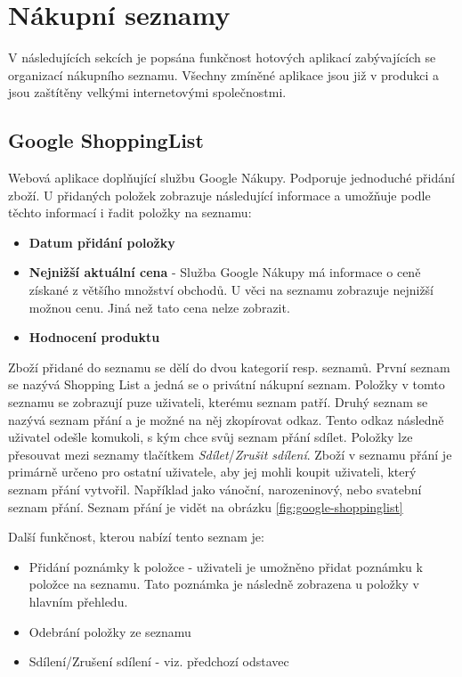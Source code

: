 \section{Nákupní seznamy}
V následujících sekcích je popsána funkčnost hotových aplikací zabývajících se organizací nákupního seznamu. Všechny zmíněné aplikace jsou již v produkci a jsou zaštítěny velkými internetovými společnostmi.

\subsection{Google ShoppingList}
Webová aplikace doplňující službu Google Nákupy. Podporuje jednoduché přidání zboží. U přidaných položek zobrazuje následující informace a umožňuje podle těchto informací i řadit položky na seznamu:
\begin{itemize}
\item \textbf{Datum přidání položky}
\item \textbf{Nejnižší aktuální cena} - Služba Google Nákupy má informace o ceně získané z většího množství obchodů. U věci na seznamu zobrazuje nejnižší možnou cenu. Jiná než tato cena nelze zobrazit.
\item \textbf{Hodnocení produktu}
\end{itemize}
Zboží přidané do seznamu se dělí do dvou kategorií resp. seznamů. První seznam se nazývá Shopping List a jedná se o privátní nákupní seznam. Položky v tomto seznamu se zobrazují puze uživateli, kterému seznam patří. Druhý seznam se nazývá seznam přání a je možné na něj zkopírovat odkaz. Tento odkaz následně uživatel odešle komukoli, s kým chce svůj seznam přání sdílet. Položky lze přesouvat mezi seznamy tlačítkem \emph{Sdílet}/\emph{Zrušit sdílení}.
Zboží v seznamu přání je primárně určeno pro ostatní uživatele, aby jej mohli koupit uživateli, který seznam přání vytvořil. Například jako vánoční, narozeninový, nebo svatební seznam přání. Seznam přání je vidět na obrázku \ref{fig:google-shoppinglist}

Další funkčnost, kterou nabízí tento seznam je:
\begin{itemize}
\item Přidání poznámky k položce - uživateli je umožněno přidat poznámku k položce na seznamu.  Tato poznámka je následně zobrazena u položky v hlavním přehledu.
\item Odebrání položky ze seznamu
\item Sdílení/Zrušení sdílení - viz. předchozí odstavec
\end{itemize}

